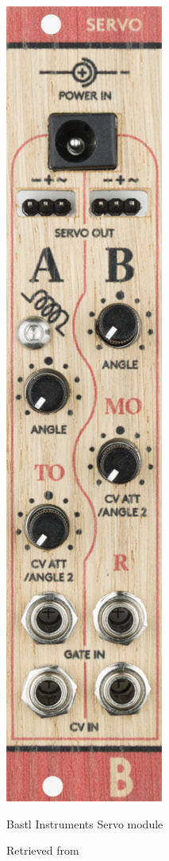 \begin{figure}[ht]
  \centering
  \includegraphics[width=0.75\linewidth,height=0.25\textheight,keepaspectratio]{images/bastl-servo.jpg}
  \caption{Bastl Instruments Servo module}
  \caption*{Retrieved from \cite{website-bastl-instruments-current}}
  \label{fig:bastl-servo}
\end{figure}

